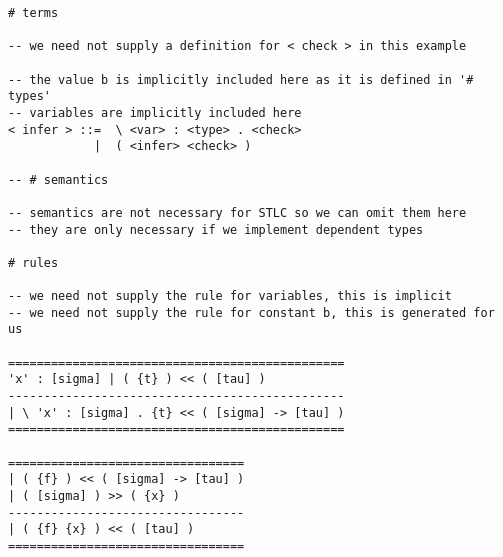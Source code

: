 \begin{appendices}
\begin{verbatim}
# terms

-- we need not supply a definition for < check > in this example

-- the value b is implicitly included here as it is defined in '# types'
-- variables are implicitly included here
< infer > ::=  \ <var> : <type> . <check>
            |  ( <infer> <check> )
 
-- # semantics  

-- semantics are not necessary for STLC so we can omit them here
-- they are only necessary if we implement dependent types

# rules

-- we need not supply the rule for variables, this is implicit
-- we need not supply the rule for constant b, this is generated for us

===============================================
'x' : [sigma] | ( {t} ) << ( [tau] )
-----------------------------------------------
| \ 'x' : [sigma] . {t} << ( [sigma] -> [tau] ) 
===============================================

=================================
| ( {f} ) << ( [sigma] -> [tau] ) 
| ( [sigma] ) >> ( {x} )
---------------------------------
| ( {f} {x} ) << ( [tau] )
=================================

\end{verbatim}
  
\end{appendices}
